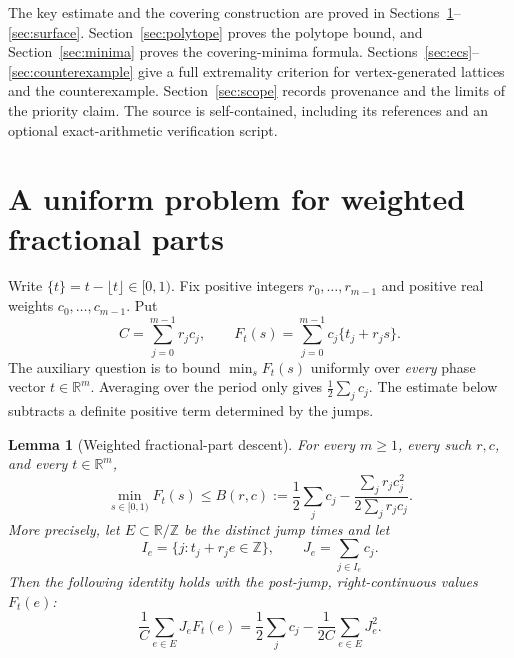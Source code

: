 \documentclass[11pt,a4paper]{article}
\newtheorem{lemma}[theorem]{Lemma}
\theoremstyle{definition}\newtheorem{definition}[theorem]{Definition}
\theoremstyle{remark}\newtheorem{remark}[theorem]{Remark}
\newcommand{\R}{\mathbb R}\newcommand{\Z}{\mathbb Z}
\begin{document}
The key estimate and the covering construction are proved in
Sections~\ref{sec:flow}--\ref{sec:surface}.
Section~\ref{sec:polytope} proves the polytope bound, and
Section~\ref{sec:minima} proves the covering-minima formula.
Sections~\ref{sec:ecs}--\ref{sec:counterexample} give a full extremality
criterion for vertex-generated lattices and the counterexample.
Section~\ref{sec:scope} records provenance and the limits of the
priority claim. The source is self-contained, including its references
and an optional exact-arithmetic verification script.

\section{A uniform problem for weighted fractional parts}
\label{sec:flow}
Write $\{t\}=t-\lfloor t\rfloor\in[0,1)$. Fix positive integers
$r_0,\ldots,r_{m-1}$ and positive real weights
$c_0,\ldots,c_{m-1}$. Put
\[
 C=\sum_{j=0}^{m-1}r_jc_j,\qquad
 F_t(s)=\sum_{j=0}^{m-1}c_j\{t_j+r_js\}.
\]
The auxiliary question is to bound $\min_s F_t(s)$ uniformly over
\emph{every} phase vector $t\in\R^m$. Averaging over the period only
gives $\frac12\sum_jc_j$. The estimate below subtracts a definite
positive term determined by the jumps.

\begin{lemma}[Weighted fractional-part descent]\label{lem:flow}
For every $m\ge1$, every such $r,c$, and every $t\in\R^m$,
\begin{equation}\label{eq:flowbound}
 \min_{s\in[0,1)}F_t(s)
 \le B(r,c):=\frac12\sum_jc_j-
       \frac{\sum_jr_jc_j^2}{2\sum_jr_jc_j}.
\end{equation}
More precisely, let $E\subset\R/\Z$ be the distinct jump times and
let
\[
 I_e=\{j:t_j+r_je\in\Z\},\qquad J_e=\sum_{j\in I_e}c_j.
\]
Then the following identity holds with the post-jump, right-continuous
values $F_t(e)$:
\begin{equation}\label{eq:jumpidentity}
 \frac1C\sum_{e\in E}J_eF_t(e)
 =\frac12\sum_jc_j-\frac1{2C}\sum_{e\in E}J_e^2.
\end{equation}
\end{lemma}
\end{document}
